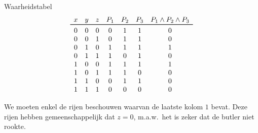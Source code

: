 \begin{oef}
\begin{opl}
\begin{samepage}
\begin{itemize}
\end{itemize}
\end{samepage}
\begin{samepage}
Waarheidstabel
\[
  \begin{array}{cccccccc}
    x & y & z & P_1 & P_2 & P_3 & P_1 \en P_2 \en P_3 \\
    \toprule
    0 & 0 & 0 & 0 & 1 & 1 & 0 \\
    0 & 0 & 1 & 0 & 1 & 1 & 0 \\
    0 & 1 & 0 & 1 & 1 & 1 & 1 \\
    0 & 1 & 1 & 1 & 0 & 1 & 0 \\
    1 & 0 & 0 & 1 & 1 & 1 & 1 \\
    1 & 0 & 1 & 1 & 1 & 0 & 0 \\
    1 & 1 & 0 & 0 & 1 & 1 & 0 \\
    1 & 1 & 1 & 0 & 0 & 0 & 0 \\
  \end{array}
\]
\end{samepage}
We moeten enkel de rijen beschouwen waarvan de laatste kolom $1$ bevat.
Deze rijen hebben gemeenschappelijk dat $z = 0$, m.a.w.\ het is
zeker dat de butler niet rookte.
\end{opl}
\end{oef}

